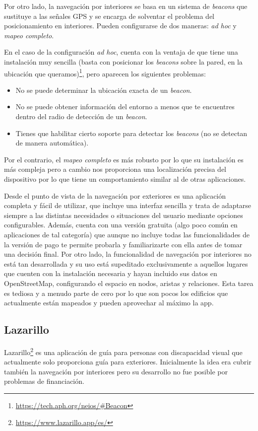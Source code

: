 Por otro lado, la navegación por interiores se basa en un sistema de \textit{beacons} que sustituye a las señales GPS y se encarga de solventar el problema del posicionamiento en interiores. Pueden configurarse de dos maneras: \textit{ad hoc} y \textit{mapeo completo}.

En el caso de la configuración \textit{ad hoc}, cuenta con la ventaja de que tiene una instalación muy sencilla (basta con posicionar los \textit{beacons} sobre la pared, en la ubicación que queramos)\footnote{\url{https://tech.aph.org/neios/\#Beacon}}, pero aparecen los siguientes problemas:
\begin{itemize}
	\item No se puede determinar la ubicación exacta de un \textit{beacon}.
	\item No se puede obtener información del entorno a menos que te encuentres dentro del radio de detección de un \textit{beacon}.
	\item Tienes que habilitar cierto soporte para detectar los \textit{beacons} (no se detectan de manera automática).
\end{itemize}

Por el contrario, el \textit{mapeo completo} es más robusto por lo que su instalación es más compleja pero a cambio nos proporciona una localización precisa del dispositivo por lo que tiene un comportamiento similar al de otras aplicaciones.

Desde el punto de vista de la navegación por exteriores es una aplicación completa y fácil de utilizar, que incluye una interfaz sencilla y trata de adaptarse siempre a las distintas necesidades o situaciones del usuario mediante opciones configurables. Además, cuenta con una versión gratuita (algo poco común en aplicaciones de tal categoría) que aunque no incluye todas las funcionalidades de la versión de pago te permite probarla y familiarizarte con ella antes de tomar una decisión final. Por otro lado, la funcionalidad de navegación por interiores no está tan desarrollada y su uso está supeditado exclusivamente a aquellos lugares que cuenten con la instalación necesaria y hayan incluido sus datos en OpenStreetMap, configurando el espacio en nodos, aristas y relaciones. Esta tarea es tediosa y a menudo parte de cero por lo que son pocos los edificios que actualmente están mapeados y pueden aprovechar al máximo la app.

\subsection{Lazarillo}
Lazarillo\footnote{\url{https://www.lazarillo.app/es/}} es una aplicación de guía para personas con discapacidad visual que actualmente solo proporciona guía para exteriores. Inicialmente la idea era cubrir también la navegación por interiores pero su desarrollo no fue posible por problemas de financiación.

